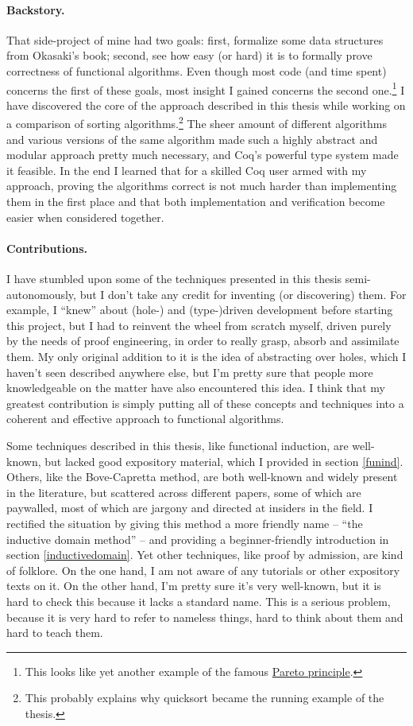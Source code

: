 \documentclass[declaration,mgr,english,shortabstract]{iithesis}
\begin{document}
\paragraph{Backstory.}{That side-project of mine had two goals: first, formalize some data structures from Okasaki's book; second, see how easy (or hard) it is to formally prove correctness of functional algorithms. Even though most code (and time spent) concerns the first of these goals, most insight I gained concerns the second one.\footnote{This looks like yet another example of the famous \href{https://en.wikipedia.org/wiki/Pareto_principle}{Pareto principle}.} I have discovered the core of the approach described in this thesis while working on a comparison of sorting algorithms.\footnote{This probably explains why quicksort became the running example of the thesis.} The sheer amount of different algorithms and various versions of the same algorithm made such a highly abstract and modular approach pretty much necessary, and Coq's powerful type system made it feasible. In the end I learned that for a skilled Coq user armed with my approach, proving the algorithms correct is not much harder than implementing them in the first place and that both implementation and verification become easier when considered together.}

\paragraph{Contributions.}{I have stumbled upon some of the techniques presented in this thesis semi-autonomously, but I don't take any credit for inventing (or discovering) them. For example, I ``knew'' about (hole-) and (type-)driven development before starting this project, but I had to reinvent the wheel from scratch myself, driven purely by the needs of proof engineering, in order to really grasp, absorb and assimilate them. My only original addition to it is the idea of abstracting over holes, which I haven't seen described anywhere else, but I'm pretty sure that people more knowledgeable on the matter have also encountered this idea. I think that my greatest contribution is simply putting all of these concepts and techniques into a coherent and effective approach to functional algorithms.

Some techniques described in this thesis, like functional induction, are well-known, but lacked good expository material, which I provided in section \ref{funind}. Others, like the Bove-Capretta method, are both well-known and widely present in the literature, but scattered across different papers, some of which are paywalled, most of which are jargony and directed at insiders in the field. I rectified the situation by giving this method a more friendly name -- ``the inductive domain method'' -- and providing a beginner-friendly introduction in section \ref{inductivedomain}. Yet other techniques, like proof by admission, are kind of folklore. On the one hand, I am not aware of any tutorials or other expository texts on it. On the other hand, I'm pretty sure it's very well-known, but it is hard to check this because it lacks a standard name. This is a serious problem, because it is very hard to refer to nameless things, hard to think about them and hard to teach them.}
\end{document}
